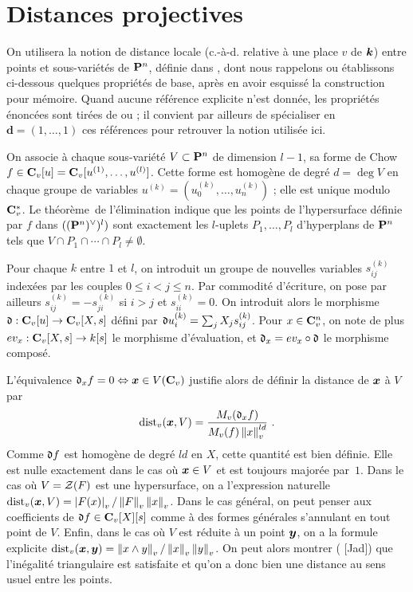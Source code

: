 \section{Distances projectives}

On utilisera la notion de distance locale (c.-à-d. relative à une place $v$ de
$\boldsymbol{k}$) entre points et sous-variétés de $\mathbf{P}^n$, définie dans \cite{pphdg},
dont nous rappelons ou établissons ci-dessous quelques propriétés de base,
après en avoir esquissé la construction pour mémoire. Quand aucune référence
explicite n'est donnée, les propriétés énoncées sont tirées de \cite{pphdg} ou
\cite{remgdmp} ; il convient par ailleurs de spécialiser en $\mathbf{d} = (1,
\dots, 1)$ ces références pour retrouver la notion utilisée ici.

On associe à chaque sous-variété $V \subset \mathbf{P}^n$ de dimension $l-1$, sa
forme de Chow $f \in \mathbf{C}_v[u] = \mathbf{C}_v[u^{(1)}, \dots, u^{(l)}]$. Cette forme est
homogène de degré $d = \deg V$ en chaque groupe de variables $u^{(k)} =
(u^{(k)}_0, \dots, u^{(k)}_n)$ ; elle est unique modulo $\mathbf{C}_v^{*}$. Le
théorème~de l'élimination indique que les points de l'hypersurface définie par
$f$ dans $((\mathbf{P}^n)^\vee)^l)$ sont exactement les $l$-uplets $P_1, \dots,
P_l$ d'hyperplans de $\mathbf{P}^n$ tels que $V \cap P_1 \cap \cdots \cap P_l \neq
\emptyset$.

Pour chaque $k$ entre $1$ et $l$, on introduit un groupe de nouvelles
variables $s^{(k)}_{ij}$ indexées par les couples $0 \le i < j \le n$. Par
commodité d'écriture, on pose par ailleurs $s^{(k)}_{ij} = - s^{(k)}_{ji}$ si
$i > j$ et $s^{(k)}_{ii} = 0$. On introduit alors le morphisme $\mathfrak{d} : \mathbf{C}_v[u]
\to \mathbf{C}_v[X, s]$ défini par $\mathfrak{d} u^{(k)}_i = \sum_j X_j s^{(k)}_{ij}$. Pour $x
\in \mathbf{C}_v^n$, on note de plus $ev_x : \mathbf{C}_v[X, s] \to k[s]$ le morphisme
d'évaluation, et $\mathfrak{d}_x = ev_x \circ \mathfrak{d}$ le morphisme composé.

L'équivalence $\mathfrak{d}_x f = 0 \Leftrightarrow \boldsymbol{x} \in V(\mathbf{C}_v)$ justifie alors de
définir la distance de $\boldsymbol{x}$ à $V$ par
\[
  \mathrm{dist}_v(\boldsymbol{x}, V) = \frac{M_v(\mathfrak{d}_x f)}{M_v(f) \left\lVert x\right\rVert_{v} ^{ld}} \text{ .}
\]
Comme $\mathfrak{d} f$ est homogène de degré $ld$ en $X$, cette quantité est bien
définie. Elle est nulle exactement dans le cas où $\boldsymbol{x} \in V$ et est toujours
majorée par~$1$. Dans le cas où $V = \mathcal Z(F)$ est une hypersurface, on a
l'expression naturelle $\mathrm{dist}_v(\boldsymbol{x}, V) = \left\lvert F(x)\right\rvert_{v} / \left\lVert F\right\rVert_{v} \left\lVert x\right\rVert_{v}$. Dans le cas
général, on peut penser aux coefficients de $\mathfrak{d} f \in \mathbf{C}_v[X][s]$ comme à des
formes générales s'annulant en tout point de $V$. Enfin, dans le cas où $V$
est réduite à un point $\boldsymbol{y}$, on a la formule explicite $\mathrm{dist}_v (\boldsymbol{x}, \boldsymbol{y}) =
\left\lVert x \wedge y\right\rVert_{v} / \left\lVert x\right\rVert_{v} \left\lVert y\right\rVert_{v}$. On peut alors montrer ( [Jad])
que l'inégalité triangulaire est satisfaite et qu'on a donc bien une distance
au sens usuel entre les points.

